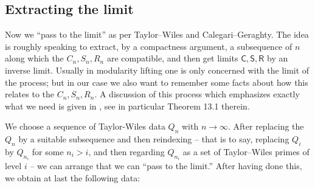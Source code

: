 \documentclass[10pt]{amsart}
\newcommand{\Cinf}{\mathsf{C}}
\newcommand{\Sinf}{\mathsf{S}}
\newcommand{\Rinf}{\mathsf{R}}
\theoremstyle{remark}
\begin{document}
 



 



\subsection{Extracting the limit}  \label{extraction}    Now we ``pass to the limit'' as per Taylor--Wiles and  Calegari--Geraghty.
 The idea is roughly speaking to extract, by a compactness argument, a subsequence of $n$ along which
the $C_n, S_n, R_n$ are compatible, and then get limits $\Cinf, \Sinf, \Rinf$ by an inverse limit. Usually in modularity lifting
one is only concerned with the limit of the process; but in our case we also want to remember
some facts about how this relates to the $C_n, S_n, R_n$. 
A discussion of this process which emphasizes exactly what we need is given in \cite[\S 13]{GV}, see in particular Theorem 13.1 therein.

 
 We choose a sequence of Taylor-Wiles data $Q_n$ with  $n \rightarrow \infty$.  
 After replacing the $Q_n$ by a suitable subsequence and then reindexing  -- that is to say, 
 replacing $Q_i$ by $Q_{n_i}$ for some $n_i > i$, and then regarding $Q_{n_i}$ as a set of Taylor--Wiles primes of level  $i$ -- 
 we can arrange that we  can ``pass to the limit.''
After having done this, we obtain at last the following data:   
  
\end{document}
